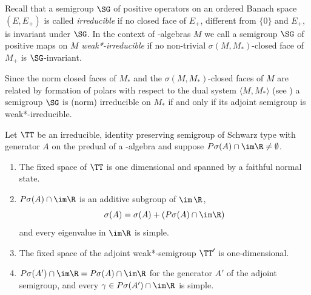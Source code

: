 Recall that a semigroup $\SG$ of positive operators on an ordered Banach space $(E,E_{+})$ is called \emph{irreducible} if no closed face of\/ $E_{+}$, different from $\{0\}$ and $E_{+}$, is invariant under $\SG$.
In the context of \WA-algebras $M$ we call a semigroup $\SG$ of positive maps on $M$ \emph{weak*-irreducible} if no non-trivial $\sigma(M,M_{*})$-closed face of\/ $M_{+}$ is $\SG$-invariant.

Since the norm closed faces of\/ $M_{*}$ and the $\sigma(M,M_{*})$-closed faces of\/ $M$ are related by formation of polars with respect to the dual system $\langle M,M_{*} \rangle$ (see \textcite[Theorem 3.6.11 and Theorem 3.10.7.]{pedersen:1979}) a semigroup $\SG$ is (norm) irreducible on $M_{*}$ if and only if its adjoint semigroup is weak*-irreducible.
\begin{theorem}\label{thm:d3-1.11}
Let $\TT$ be an irreducible, identity preserving semigroup of Schwarz type with generator $A$ on the predual of a \WA-algebra and suppose $P\sigma(A) \cap \im\R \neq \emptyset$.
\begin{enumerate}[\upshape (i)]
\item 
The fixed space of\/ $\TT$ is one dimensional and spanned by a faithful normal state.

\item 
$P\sigma(A) \cap \im\R$ is an additive subgroup of\/ $\im \, \R$,
\[
\sigma(A) = \sigma(A) + (P\sigma(A) \cap \im\R)
\]
and every eigenvalue in $\im\R$ is simple.

\item 
The fixed space of the adjoint weak*-semigroup $\TT'$ is one-dimensional.

\item 
$P{\sigma}(A') \cap \im\R = P\sigma(A) \cap \im\R$ for the generator $A'$ of the adjoint semigroup, and every $\gamma \in P{\sigma}(A') \cap \im\R$ is simple.
\end{enumerate}
\end{theorem}

